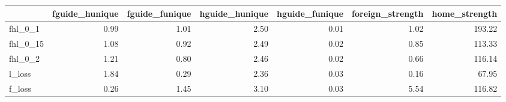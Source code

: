 \begin{tabular}{lrrrrrr}
\toprule
 & fguide_hunique & fguide_funique & hguide_hunique & hguide_funique & foreign_strength & home_strength \\
\midrule
fhl_0_1 & 0.99 & 1.01 & 2.50 & 0.01 & 1.02 & 193.22 \\
fhl_0_15 & 1.08 & 0.92 & 2.49 & 0.02 & 0.85 & 113.33 \\
fhl_0_2 & 1.21 & 0.80 & 2.46 & 0.02 & 0.66 & 116.14 \\
l_loss & 1.84 & 0.29 & 2.36 & 0.03 & 0.16 & 67.95 \\
f_loss & 0.26 & 1.45 & 3.10 & 0.03 & 5.54 & 116.82 \\
\bottomrule
\end{tabular}

